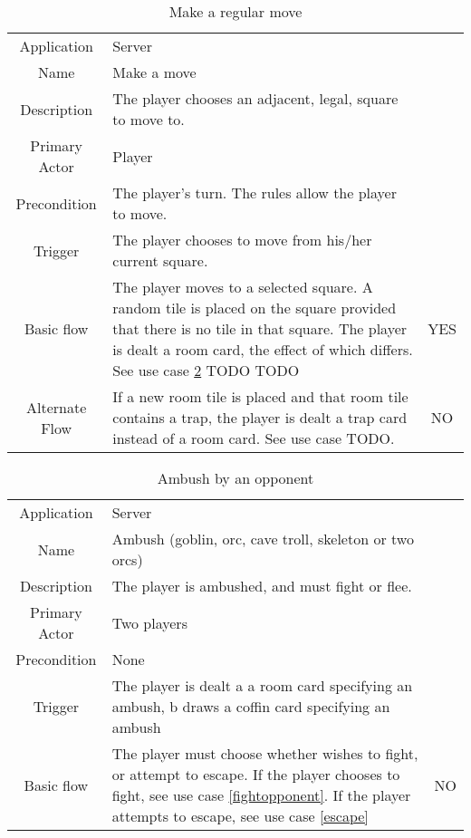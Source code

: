 \documentclass[a4paper,10pt]{report}
\begin{document}
\begin{table}
\caption{Make a regular move}
\label{move}
\begin{tabular}{|c| p{9cm}|c}
\hline
Application & Server & \\
Name & Make a move & \\
Description & The player chooses an adjacent, legal, square to move to. & \\
Primary Actor & Player & \\
Precondition & The player's turn. The rules allow the player to move. & \\
Trigger & The player chooses to move from his/her current square. & \\ \hline
Basic flow & The player moves to a selected square. A random tile is placed on the square provided that there is no tile in that square. The player is dealt a room card, the effect of which differs. See use case \ref{ambushopponent} TODO TODO & YES \\ \hline
Alternate Flow & If a new room tile is placed and that room tile contains a trap, the player is dealt a trap card instead of a room card. See use case TODO.  & NO \\\hline
\hline
\end{tabular}
\end{table}


\begin{table}
\caption{Ambush by an opponent}
\label{ambushopponent}
\begin{tabular}{|c| p{9cm}|c}
\hline
Application & Server & \\
Name & Ambush (goblin, orc, cave troll, skeleton or two orcs) & \\
Description & The player is ambushed, and must fight or flee. & \\
Primary Actor & Two players & \\
Precondition & None & \\
Trigger & The player is dealt a a room card specifying an ambush, b draws a coffin card specifying an ambush & \\ \hline
Basic flow & The player must choose whether wishes to fight, or attempt to escape. If the player chooses to fight, see use case \ref{fightopponent}. If the player attempts to escape, see use case \ref{escape} & NO\\
\hline
\end{tabular}
\end{table}
\end{document}
